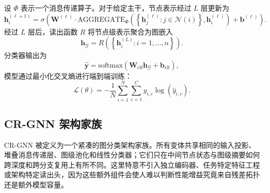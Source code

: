 设 $\Phi$ 表示一个消息传递算子。对于给定主干，节点表示经过 $L$ 层更新为
\begin{equation}
\mathbf{h}_i^{(\ell+1)} = \sigma\left(\mathbf{W}^{(\ell)} \cdot \text{AGGREGATE}_{\Phi}\left(\left\{\mathbf{h}_j^{(\ell)} : j \in \mathcal{N}(i)\right\}, \mathbf{h}_i^{(\ell)}\right) + \mathbf{b}^{(\ell)}\right).
\end{equation}
经过 $L$ 层后，读出函数 $R$ 将节点级表示聚合为图嵌入
\begin{equation}
\mathbf{h}_{\mathcal{G}} = R\left(\left\{\mathbf{h}_i^{(L)} : i = 1, \ldots, n\right\}\right).
\end{equation}
分类器输出为
\begin{equation}
\hat{\mathbf{y}} = \text{softmax}\left(\mathbf{W}_{\text{clf}} \mathbf{h}_{\mathcal{G}} + \mathbf{b}_{\text{clf}}\right),
\end{equation}
模型通过最小化交叉熵进行端到端训练：
\begin{equation}
\mathcal{L}(\theta) = -\frac{1}{N} \sum_{i=1}^{N} \sum_{c=1}^{C} y_{i,c} \log(\hat{y}_{i,c}).
\end{equation}

\subsection{CR-GNN 架构家族}
\label{sec:model}

CR-GNN 被定义为一个紧凑的图分类架构家族。所有变体共享相同的输入投影、堆叠消息传递层、图级池化和线性分类器；它们只在中间节点状态与图级摘要如何跨深度和跨分支复用上有所不同。这里特意不引入独立编码器、任务特定特征工程或架构特定读出头，因为这些额外组件会使人难以判断性能增益究竟来自残差拓扑还是额外模型容量。

